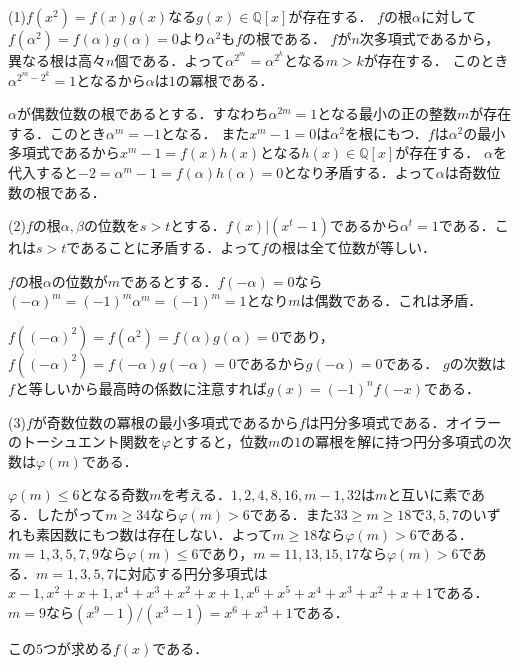 \documentclass[
		book,
		head_space=20mm,
		foot_space=20mm,
		gutter=10mm,
		line_length=190mm
]{jlreq}
\begin{document}
(1)$f(x^2)=f(x)g(x)$なる$g(x)\in \mathbb{Q}[x]$が存在する．
$f$の根$\alpha$に対して$f(\alpha^2)=f(\alpha)g(\alpha)=0$より$\alpha^2$も$f$の根である．
$f$が$n$次多項式であるから，異なる根は高々$n$個である．よって$\alpha^{2^m}=\alpha^{2^k}$となる$m>k$が存在する．
このとき$\alpha^{2^m-2^k}=1$となるから$\alpha$は$1$の冪根である．

$\alpha$が偶数位数の根であるとする．すなわち$\alpha^{2m}=1$となる最小の正の整数$m$が存在する．このとき$\alpha^m= -1$となる．
また$x^{m}-1=0$は$\alpha^2$を根にもつ．$f$は$\alpha^2$の最小多項式であるから$x^{m}-1=f(x)h(x)$となる$h(x)\in \mathbb{Q}[x]$が存在する．
$\alpha$を代入すると$-2=\alpha^{m}-1=f(\alpha)h(\alpha)=0$となり矛盾する．よって$\alpha$は奇数位数の根である．

(2)$f$の根$\alpha,\beta$の位数を$s>t$とする．$f(x)|(x^t-1)$であるから$\alpha^t=1$である．これは$s>t$であることに矛盾する．よって$f$の根は全て位数が等しい．

$f$の根$\alpha$の位数が$m$であるとする．$f(-\alpha)=0$なら$(-\alpha)^m=(-1)^m\alpha^m=(-1)^m=1$となり$m$は偶数である．これは矛盾．

$f((-\alpha)^2)=f(\alpha^2)=f(\alpha)g(\alpha)=0$であり，$f((-\alpha)^2)=f(-\alpha)g(-\alpha)=0$であるから$g(-\alpha)=0$である．
$g$の次数は$f$と等しいから最高時の係数に注意すれば$g(x)=(-1)^nf(-x)$である．

(3)$f$が奇数位数の冪根の最小多項式であるから$f$は円分多項式である．オイラーのトーシュエント関数を$\varphi$とすると，位数$m$の$1$の冪根を解に持つ円分多項式の次数は$\varphi(m)$である．

$\varphi(m)\le 6$となる奇数$m$を考える．$1,2,4,8,16,m-1,32$は$m$と互いに素である．したがって$m\ge 34$なら$\varphi(m)> 6$である．また$33\ge m\ge 18$で$3,5,7$のいずれも素因数にもつ数は存在しない．よって$m\ge 18$なら$\varphi(m)> 6$である．
$m=1,3,5,7,9$なら$\varphi(m)\le 6$であり，$m=11,13,15,17$なら$\varphi(m)> 6$である．$m=1,3,5,7$に対応する円分多項式は$x-1,x^2+x+1,x^4+x^3+x^2+x+1,x^6+ x^5+x^4+x^3+x^2+x+1$である．$m=9$なら$(x^9-1)/(x^3-1)=x^6+x^3+1$である．

この$5$つが求める$f(x)$である．
\end{document}
